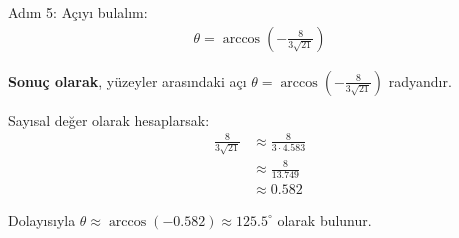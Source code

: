\documentclass[11pt,letterpaper,twocolumn]{fenbil}
\begin{document}
Adım 5: Açıyı bulalım:
\begin{align}
\theta = \arccos\left(-\frac{8}{3\sqrt{21}}\right)
\end{align}

\textbf{Sonuç olarak}, yüzeyler arasındaki açı $\theta = \arccos\left(-\frac{8}{3\sqrt{21}}\right)$ radyandır.

Sayısal değer olarak hesaplarsak:
\begin{align}
\frac{8}{3\sqrt{21}} &\approx \frac{8}{3 \cdot 4.583} \\
&\approx \frac{8}{13.749} \\
&\approx 0.582
\end{align}

Dolayısıyla $\theta \approx \arccos(-0.582) \approx 125.5^{\circ}$ olarak bulunur.
\end{document}
